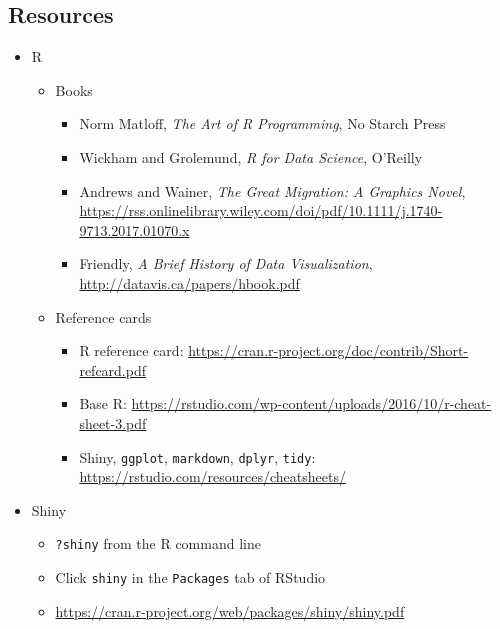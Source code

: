 \documentclass[10pt, letterpaper]{article}
\begin{document}
\begin{spacing}{1.0}

\section{Resources}\label{sec:resources}

\begin{itemize}

  \item R
    \begin{itemize}   
      \item Books
        \begin{itemize}
          \item Norm Matloff, \textit{The Art of R Programming}, No Starch Press
          \item Wickham and Grolemund, \textit{R for Data Science}, O'Reilly
          \item Andrews and Wainer, \textit{The Great Migration:  A Graphics Novel}, \url{https://rss.onlinelibrary.wiley.com/doi/pdf/10.1111/j.1740-9713.2017.01070.x}
          \item Friendly, \textit{A Brief History of Data Visualization}, \url{http://datavis.ca/papers/hbook.pdf}
        \end{itemize}
      \item Reference cards
        \begin{itemize}
          \item R reference card:  \url{https://cran.r-project.org/doc/contrib/Short-refcard.pdf}
          \item Base R:  \url{https://rstudio.com/wp-content/uploads/2016/10/r-cheat-sheet-3.pdf}
          \item Shiny, \texttt{ggplot}, \texttt{markdown}, \texttt{dplyr}, \texttt{tidy}: \url{https://rstudio.com/resources/cheatsheets/}
        \end{itemize}
    \end{itemize}

  \item Shiny
    \begin{itemize}[noitemsep]
        \item \texttt{?shiny} from the R command line
        \item Click \texttt{shiny} in the \texttt{Packages} tab of RStudio
        \item \url{https://cran.r-project.org/web/packages/shiny/shiny.pdf}
    \end{itemize}


\end{itemize}
\end{spacing}
\end{document}
